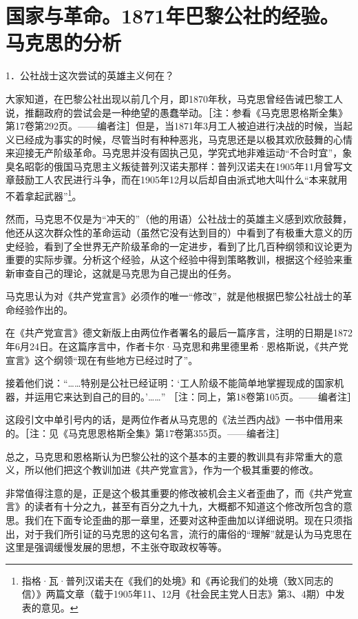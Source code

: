 \documentclass[UTF8, 12pt, a4paper]{ctexrep}
\begin{document}
\chapter{国家与革命。1871年巴黎公社的经验。马克思的分析}

1．公社战士这次尝试的英雄主义何在？

大家知道，在巴黎公社出现以前几个月，即1870年秋，马克思曾经告诫巴黎工人说，推翻政府的尝试会是一种绝望的愚蠢举动。［注：参看《马克思恩格斯全集》第17卷第292页。——编者注］但是，当1871年3月工人被迫进行决战的时候，当起义已经成为事实的时候，尽管当时有种种恶兆，马克思还是以极其欢欣鼓舞的心情来迎接无产阶级革命。马克思并没有固执己见，学究式地非难运动“不合时宜”，象臭名昭彰的俄国马克思主义叛徒普列汉诺夫那样：普列汉诺夫在1905年11月曾写文章鼓励工人农民进行斗争，而在1905年12月以后却自由派式地大叫什么“本来就用不着拿起武器”\footnote{指格·瓦·普列汉诺夫在《我们的处境》和《再论我们的处境（致X同志的信）》两篇文章（载于1905年11、12月《社会民主党人日志》第3、4期）中发表的意见。}。

然而，马克思不仅是为“冲天的”（他的用语）公社战士的英雄主义感到欢欣鼓舞，他还从这次群众性的革命运动（虽然它没有达到目的）中看到了有极重大意义的历史经验，看到了全世界无产阶级革命的一定进步，看到了比几百种纲领和议论更为重要的实际步骤。分析这个经验，从这个经验中得到策略教训，根据这个经验来重新审查自己的理论，这就是马克思为自己提出的任务。

马克思认为对《共产党宣言》必须作的唯一“修改”，就是他根据巴黎公社战士的革命经验作出的。

在《共产党宣言》德文新版上由两位作者署名的最后一篇序言，注明的日期是1872年6月24日。在这篇序言中，作者卡尔·马克思和弗里德里希·恩格斯说，《共产党宣言》这个纲领“现在有些地方已经过时了”。

接着他们说：“……特别是公社已经证明：‘工人阶级不能简单地掌握现成的国家机器，并运用它来达到自己的目的。’……” ［注：同上，第18卷第105页。——编者注］

这段引文中单引号内的话，是两位作者从马克思的《法兰西内战》一书中借用来的。［注：见《马克思恩格斯全集》第17卷第355页。——编者注］

总之，马克思和恩格斯认为巴黎公社的这个基本的主要的教训具有非常重大的意义，所以他们把这个教训加进《共产党宣言》，作为一个极其重要的修改。

非常值得注意的是，正是这个极其重要的修改被机会主义者歪曲了，而《共产党宣言》的读者有十分之九，甚至有百分之九十九，大概都不知道这个修改所包含的意思。我们在下面专论歪曲的那一章里，还要对这种歪曲加以详细说明。现在只须指出，对于我们所引证的马克思的这句名言，流行的庸俗的“理解”就是认为马克思在这里是强调缓慢发展的思想，不主张夺取政权等等。
\end{document}
